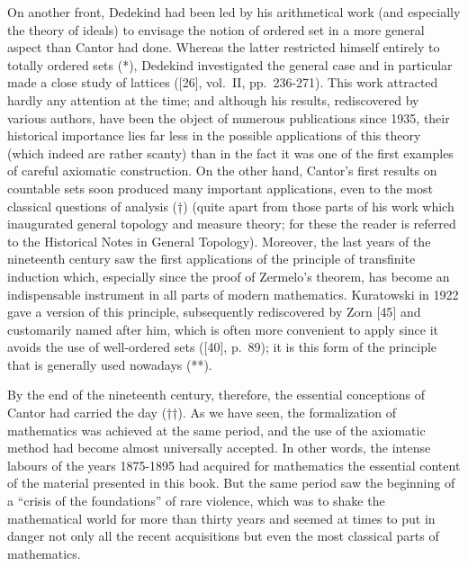 On another front, Dedekind had been led by his arithmetical work (and especially the theory of ideals) to envisage the notion of ordered set in a more general aspect than Cantor had done. Whereas the latter restricted himself entirely to totally ordered sets (*), Dedekind investigated the general case and in particular made a close study of lattices ({[}26{]}, vol.~II, pp.~236-271). This work attracted hardly any attention at the time; and although his results, rediscovered by various authors, have been the object of numerous publications since 1935, their historical importance lies far less in the possible applications of this theory (which indeed are rather scanty) than in the fact it was one of the first examples of careful axiomatic construction. On the other hand, Cantor's first results on countable sets soon produced many important applications, even to the most classical questions of analysis (†) (quite apart from those parts of his work which inaugurated general topology and measure theory; for these the reader is referred to the Historical Notes in General Topology). Moreover, the last years of the nineteenth century saw the first applications of the principle of transfinite induction which, especially since the proof of Zermelo's theorem, has become an indispensable instrument in all parts of modern mathematics. Kuratowski in 1922 gave a version of this principle, subsequently rediscovered by Zorn {[}45{]} and customarily named after him, which is often more convenient to apply since it avoids the use of well-ordered sets ({[}40{]}, p.~89); it is this form of the principle that is generally used nowadays (**).

By the end of the nineteenth century, therefore, the essential conceptions of Cantor had carried the day (††). As we have seen, the formalization of mathematics was achieved at the same period, and the use of the axiomatic method had become almost universally accepted. In other words, the intense labours of the years 1875-1895 had acquired for mathematics the essential content of the material presented in this book. But the same period saw the beginning of a ``crisis of the foundations'' of rare violence, which was to shake the mathematical world for more than thirty years and seemed at times to put in danger not only all the recent acquisitions but even the most classical parts of mathematics.

